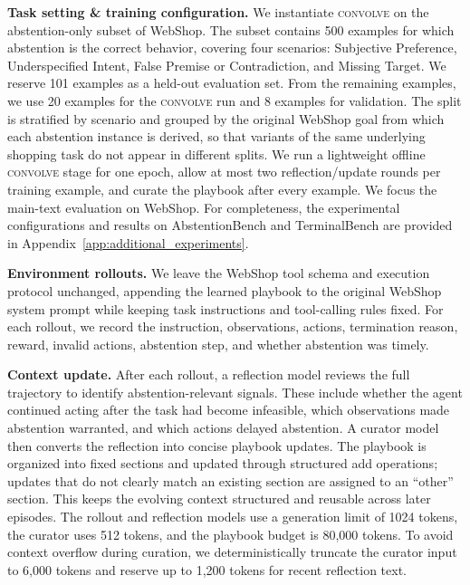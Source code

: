 \documentclass{article}
\newcommand{\method}{\textsc{convolve}\xspace}
\begin{document}

\textbf{Task setting \& training configuration.}
We instantiate \method on the abstention-only subset of WebShop. The subset contains 500 examples for which abstention is the correct behavior, covering four scenarios: Subjective Preference, Underspecified Intent, False Premise or Contradiction, and Missing Target. We reserve 101 examples as a held-out evaluation set. From the remaining examples, we use 20 examples for the \method run and 8 examples for validation. The split is stratified by scenario and grouped by the original WebShop goal from which each abstention instance is derived, so that variants of the same underlying shopping task do not appear in different splits. We run a lightweight offline \method stage for one epoch, allow at most two reflection/update rounds per training example, and curate the playbook after every example. We focus the main-text evaluation on WebShop. For completeness, the experimental configurations and results on AbstentionBench and TerminalBench are provided in Appendix~\ref{app:additional_experiments}.

\textbf{Environment rollouts.}
We leave the WebShop tool schema and execution protocol unchanged, appending the learned playbook to the original WebShop system prompt while keeping task instructions and tool-calling rules fixed. For each rollout, we record the instruction, observations, actions, termination reason, reward, invalid actions, abstention step, and whether abstention was timely.

\textbf{Context update.}
After each rollout, a reflection model reviews the full trajectory to identify abstention-relevant signals. These include whether the agent continued acting after the task had become infeasible, which observations made abstention warranted, and which actions delayed abstention. A curator model then converts the reflection into concise playbook updates. The playbook is organized into fixed sections and updated through structured add operations; updates that do not clearly match an existing section are assigned to an ``other'' section. This keeps the evolving context structured and reusable across later episodes. The rollout and reflection models use a generation limit of 1024 tokens, the curator uses 512 tokens, and the playbook budget is 80,000 tokens. To avoid context overflow during curation, we deterministically truncate the curator input to 6,000 tokens and reserve up to 1,200 tokens for recent reflection text.
\end{document}
